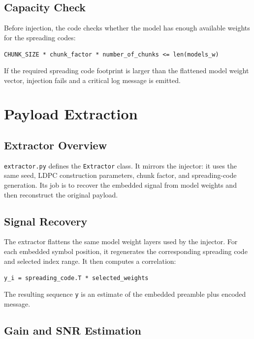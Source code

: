 \documentclass[11pt,a4paper]{article}
\newcommand{\code}[1]{\texttt{#1}}
\begin{document}
\subsection{Capacity Check}

Before injection, the code checks whether the model has enough available weights for the spreading codes:

\begin{center}
\code{CHUNK\_SIZE * chunk\_factor * number\_of\_chunks <= len(models\_w)}
\end{center}

If the required spreading code footprint is larger than the flattened model weight vector, injection fails and a critical log message is emitted.

\section{Payload Extraction}

\subsection{Extractor Overview}

\code{extractor.py} defines the \code{Extractor} class. It mirrors the injector: it uses the same seed, LDPC construction parameters, chunk factor, and spreading-code generation. Its job is to recover the embedded signal from model weights and then reconstruct the original payload.

\subsection{Signal Recovery}

The extractor flattens the same model weight layers used by the injector. For each embedded symbol position, it regenerates the corresponding spreading code and selected index range. It then computes a correlation:

\begin{center}
\code{y\_i = spreading\_code.T * selected\_weights}
\end{center}

The resulting sequence \code{y} is an estimate of the embedded preamble plus encoded message.

\subsection{Gain and SNR Estimation}
\end{document}
